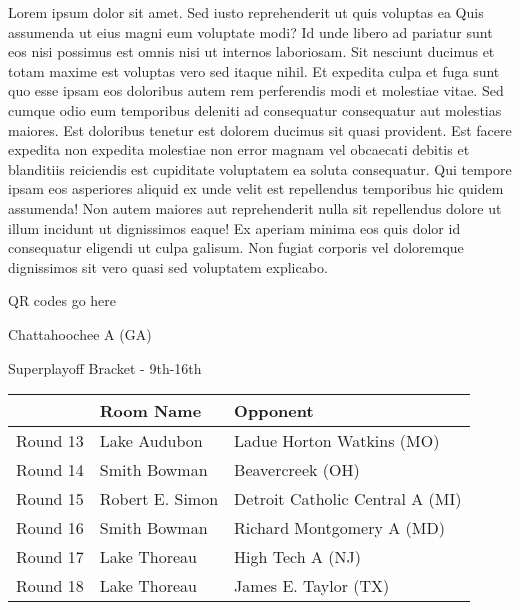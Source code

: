 \documentclass{article}%
\begin{document}
\vspace*{8pt}%
\linebreak%
\newline%
\newline%
Lorem ipsum dolor sit amet. Sed iusto reprehenderit ut quis voluptas ea Quis assumenda ut eius magni eum voluptate modi? Id unde libero ad pariatur sunt eos nisi possimus est omnis nisi ut internos laboriosam. Sit nesciunt ducimus et totam maxime est voluptas vero sed itaque nihil. Et expedita culpa et fuga sunt quo esse ipsam eos doloribus autem rem perferendis modi et molestiae vitae.\newline%
\newline%
Sed cumque odio eum temporibus deleniti ad consequatur consequatur aut molestias maiores. Est doloribus tenetur est dolorem ducimus sit quasi provident. Est facere expedita non expedita molestiae non error magnam vel obcaecati debitis et blanditiis reiciendis est cupiditate voluptatem ea soluta consequatur. Qui tempore ipsam eos asperiores aliquid ex unde velit est repellendus temporibus hic quidem assumenda!\newline%
\newline%
Non autem maiores aut reprehenderit nulla sit repellendus dolore ut illum incidunt ut dignissimos eaque! Ex aperiam minima eos quis dolor id consequatur eligendi ut culpa galisum. Non fugiat corporis vel doloremque dignissimos sit vero quasi sed voluptatem explicabo.\newline%
\newline%
%
\vspace*{30pt}%
\begin{center}%
\begin{Huge}%
QR codes go here%
\end{Huge}%
\end{center}%
\newpage%
\begin{center}%
\begin{Huge}%
Chattahoochee A (GA)%
\end{Huge}%
\vspace*{8pt}%
\linebreak%
\begin{Large}%
Superplayoff Bracket {-} 9th{-}16th%
\end{Large}%
\end{center}%
%
\begin{tabularx}{\textwidth}{|c|Y|Y|}%
\hline%
&Room Name&Opponent\\%
\hline%
Round 13&Lake Audubon&Ladue Horton Watkins (MO)\\%
Round 14&Smith Bowman&Beavercreek (OH)\\%
Round 15&Robert E. Simon&Detroit Catholic Central A (MI)\\%
Round 16&Smith Bowman&Richard Montgomery A (MD)\\%
Round 17&Lake Thoreau&High Tech A (NJ)\\%
Round 18&Lake Thoreau&James E. Taylor (TX)\\%
\hline%
\end{tabularx}%
\end{document}
